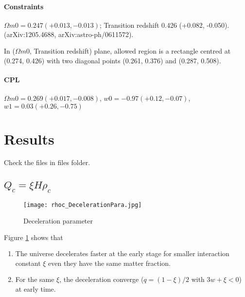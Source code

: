 \documentclass[12pt,a4paper]{article}
\begin{document}
\paragraph{Constraints}
$\Omega m0=0.247 (+0.013,-0.013)$; Transition redshift 0.426 (+0.082, -0.050).(arXiv:1205.4688, arXiv:astro-ph/0611572).

In ($\Omega m0$, Transition redshift) plane, allowed region is a rectangle centred at (0.274, 0.426) with two diagonal points (0.261, 0.376) and (0.287, 0.508).


\paragraph{CPL}
$\Omega m0=0.269 (+0.017, -0.008)$, $w0 = -0.97 (+0.12, -0.07)$, $w1=0.03 (+0.26, -0.75)$



\section{Results}

Check the files in files folder.

\subsection{$Q_c=\xi H \rho_c$}






\begin{figure}[!htpb]
\centering
\texttt{[image: rhoc\_DecelerationPara.jpg]}
\caption{Deceleration parameter}\label{fig-rhoc_DecPara}
\end{figure}


Figure \ref{fig-rhoc_DecPara} shows that 
\begin{enumerate}
\item  
The universe decelerates faster at the early stage for smaller interaction constant $\xi$ even they have the same matter fraction.
\item
For the same $\xi$, the deceleration converge ($q=(1-\xi)/2$ with $3w+\xi < 0$) at early time.
\end{enumerate}

\end{document}

